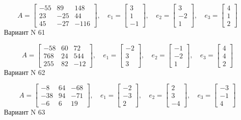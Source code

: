 \documentclass[11pt]{report}
\begin{document}
$$A = \left[\begin{matrix}-55 & 89 & 148\\23 & -25 & 44\\45 & -27 & -116\end{matrix}\right],\quad e_1 = \left[\begin{matrix}3\\1\\-1\end{matrix}\right],\quad e_2 = \left[\begin{matrix}3\\-2\\1\end{matrix}\right],\quad e_3 = \left[\begin{matrix}4\\1\\2\end{matrix}\right]$$Вариант N 61

$$A = \left[\begin{matrix}-58 & 60 & 72\\768 & 24 & 544\\255 & 82 & -12\end{matrix}\right],\quad e_1 = \left[\begin{matrix}-2\\3\\3\end{matrix}\right],\quad e_2 = \left[\begin{matrix}-1\\-2\\1\end{matrix}\right],\quad e_3 = \left[\begin{matrix}4\\4\\2\end{matrix}\right]$$Вариант N 62

$$A = \left[\begin{matrix}-8 & 64 & -68\\-38 & 94 & -71\\-6 & 6 & 19\end{matrix}\right],\quad e_1 = \left[\begin{matrix}-2\\-3\\2\end{matrix}\right],\quad e_2 = \left[\begin{matrix}2\\3\\-4\end{matrix}\right],\quad e_3 = \left[\begin{matrix}-3\\-1\\4\end{matrix}\right]$$Вариант N 63
\end{document}
